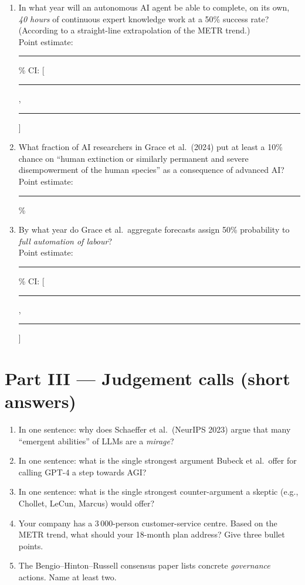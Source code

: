 \documentclass[11pt,a4paper]{article}
\begin{document}
\begin{enumerate}[label=Q\arabic*., start=8]

\item In what year will an autonomous AI agent be able to complete,
      on its own, \emph{40 hours} of continuous expert knowledge work at
      a 50\% success rate? (According to a straight-line extrapolation
      of the METR trend.) \\
      Point estimate: \rule{2cm}{0.4pt} \% CI: [\rule{2cm}{0.4pt}, \rule{2cm}{0.4pt}]

\item What fraction of AI researchers in Grace et al.\ (2024) put at least
      a 10\% chance on ``human extinction or similarly permanent and severe
      disempowerment of the human species'' as a consequence of advanced AI? \\
      Point estimate: \rule{2cm}{0.4pt}\%

\item By what year do Grace et al.\ aggregate forecasts assign 50\%
      probability to \emph{full automation of labour}? \\
      Point estimate: \rule{2cm}{0.4pt} \% CI: [\rule{2cm}{0.4pt}, \rule{2cm}{0.4pt}]

\end{enumerate}

\vspace{1em}
\section*{Part III --- Judgement calls (short answers)}

\begin{enumerate}[label=Q\arabic*., start=11]

\item In one sentence: why does Schaeffer et al.\ (NeurIPS 2023) argue that
      many ``emergent abilities'' of LLMs are a \emph{mirage}?

\item In one sentence: what is the single strongest argument Bubeck et al.\
      offer for calling GPT-4 a step towards AGI?

\item In one sentence: what is the single strongest counter-argument a
      skeptic (e.g., Chollet, LeCun, Marcus) would offer?

\item Your company has a 3\,000-person customer-service centre. Based on
      the METR trend, what should your 18-month plan address? Give three
      bullet points.

\item The Bengio--Hinton--Russell consensus paper lists concrete
      \emph{governance} actions. Name at least two.

\end{enumerate}
\end{document}
